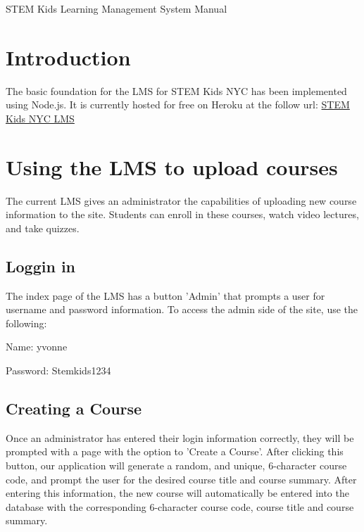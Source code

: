 \documentclass[12pt]{article}
\begin{document}
STEM Kids Learning Management System Manual

\tableofcontents

\section{Introduction}
The basic foundation for the LMS for STEM Kids NYC has been implemented using Node.js. It is currently hosted for free on Heroku at the follow url:
\href{https://stemkidslms.herokuapp.com/}{STEM Kids NYC LMS}

\section{Using the LMS to upload courses}
The current LMS gives an administrator the capabilities of uploading new course information to the site. Students can enroll in these courses, watch video lectures, and take quizzes.
\subsection{Loggin in}
The index page of the LMS has a button 'Admin' that prompts a user for username and password information. To access the admin side of the site, use the following:

Name: yvonne

Password: Stemkids1234

\subsection{Creating a Course}
Once an administrator has entered their login information correctly, they will be prompted with a page with the option to 'Create a Course'. After clicking this button, our application will generate a random, and unique, 6-character course code, and prompt the user for the desired course title and course summary. After entering this information, the new course will automatically be entered into the database with the corresponding 6-character course code, course title and course summary.
\end{document}
